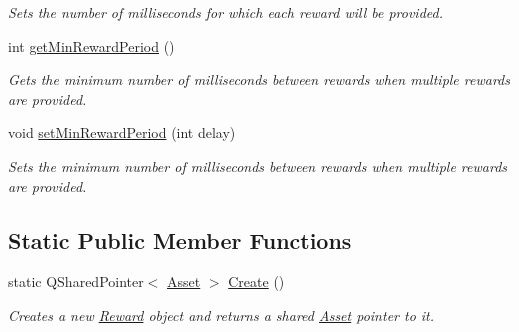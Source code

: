 \begin{DoxyCompactItemize}
\begin{DoxyCompactList}\small\item\em Sets the number of milliseconds for which each reward will be provided. \end{DoxyCompactList}\item 
\hypertarget{class_picto_1_1_reward_a64598f6387d8ec06a440bde06cbc6903}{int \hyperlink{class_picto_1_1_reward_a64598f6387d8ec06a440bde06cbc6903}{get\-Min\-Reward\-Period} ()}\label{class_picto_1_1_reward_a64598f6387d8ec06a440bde06cbc6903}

\begin{DoxyCompactList}\small\item\em Gets the minimum number of milliseconds between rewards when multiple rewards are provided. \end{DoxyCompactList}\item 
\hypertarget{class_picto_1_1_reward_a7d0807fc4c0d7e24910bcc7fd0d060f2}{void \hyperlink{class_picto_1_1_reward_a7d0807fc4c0d7e24910bcc7fd0d060f2}{set\-Min\-Reward\-Period} (int delay)}\label{class_picto_1_1_reward_a7d0807fc4c0d7e24910bcc7fd0d060f2}

\begin{DoxyCompactList}\small\item\em Sets the minimum number of milliseconds between rewards when multiple rewards are provided. \end{DoxyCompactList}\end{DoxyCompactItemize}
\subsection*{Static Public Member Functions}
\begin{DoxyCompactItemize}
\item 
\hypertarget{class_picto_1_1_reward_a90319014a2d1e40e94d5432d0bc62934}{static Q\-Shared\-Pointer$<$ \hyperlink{class_picto_1_1_asset}{Asset} $>$ \hyperlink{class_picto_1_1_reward_a90319014a2d1e40e94d5432d0bc62934}{Create} ()}\label{class_picto_1_1_reward_a90319014a2d1e40e94d5432d0bc62934}

\begin{DoxyCompactList}\small\item\em Creates a new \hyperlink{class_picto_1_1_reward}{Reward} object and returns a shared \hyperlink{class_picto_1_1_asset}{Asset} pointer to it. \end{DoxyCompactList}\end{DoxyCompactItemize}
